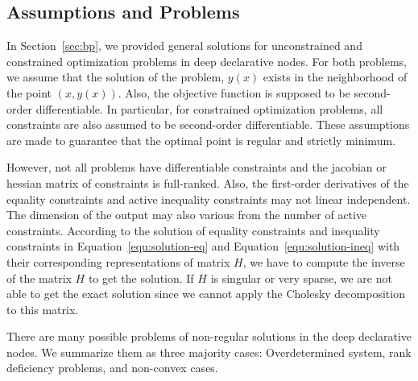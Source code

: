 \subsection{Assumptions and Problems}
In Section~\ref{sec:bp}, we provided general solutions for unconstrained and constrained optimization problems in deep declarative nodes. For both problems, we assume that the solution of the problem, $y(x)$ exists in the neighborhood of the point $(x, y(x))$. Also, the objective function is supposed to be second-order differentiable. In particular, for constrained optimization problems, all constraints are also assumed to be second-order differentiable. These assumptions are made to guarantee that the optimal point is regular and strictly minimum. 
\par However, not all problems have differentiable constraints and the jacobian or hessian matrix of constraints is full-ranked. Also, the first-order derivatives of the equality constraints and active inequality constraints may not linear independent. The dimension of the output may also various from the number of active constraints. According to the solution of equality constraints and inequality constraints in Equation~\ref{equ:solution-eq} and Equation~\ref{equ:solution-ineq} with their corresponding representations of matrix $H$, we have to compute the inverse of the matrix $H$ to get the solution. If $H$ is singular or very sparse, we are not able to get the exact solution since we cannot apply the Cholesky decomposition to this matrix. 
\par There are many possible problems of non-regular solutions in the deep declarative nodes. We summarize them as three majority cases: Overdetermined system, rank deficiency problems, and non-convex cases. 

